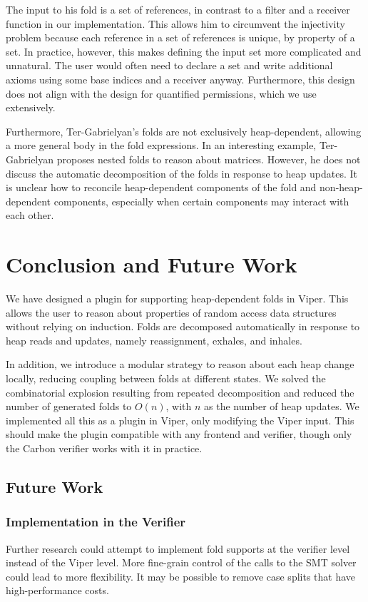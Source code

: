 \documentclass[msc,oneside]{ubcthesis}
\begin{document}
The input to his fold is a set of references, in contrast to a filter and a receiver function in our implementation. This allows him to circumvent the injectivity problem because each reference in a set of references is unique, by property of a set. In practice, however, this makes defining the input set more complicated and unnatural. The user would often need to declare a set and write additional axioms using some base indices and a receiver anyway. Furthermore, this design does not align with the design for quantified permissions, which we use extensively. 

Furthermore, Ter-Gabrielyan's folds are not exclusively heap-dependent, allowing a more general body in the fold expressions. In an interesting example, Ter-Gabrielyan proposes nested folds to reason about matrices. However, he does not discuss the automatic decomposition of the folds in response to heap updates. It is unclear how to reconcile heap-dependent components of the fold and non-heap-dependent components, especially when certain components may interact with each other. 

\chapter{Conclusion and Future Work}
We have designed a plugin for supporting heap-dependent folds in Viper. This allows the user to reason about properties of random access data structures without relying on induction. Folds are decomposed automatically in response to heap reads and updates, namely reassignment, exhales, and inhales. 

In addition, we introduce a modular strategy to reason about each heap change locally, reducing coupling between folds at different states. We solved the combinatorial explosion resulting from repeated decomposition and reduced the number of generated folds to $O(n)$, with $n$ as the number of heap updates. We implemented all this as a plugin in Viper, only modifying the Viper input. This should make the plugin compatible with any frontend and verifier, though only the Carbon verifier works with it in practice.


\section{Future Work}
\subsection{Implementation in the Verifier}
Further research could attempt to implement fold supports at the verifier level instead of the Viper level. More fine-grain control of the calls to the SMT solver could lead to more flexibility. It may be possible to remove case splits that have high-performance costs.
\end{document}
